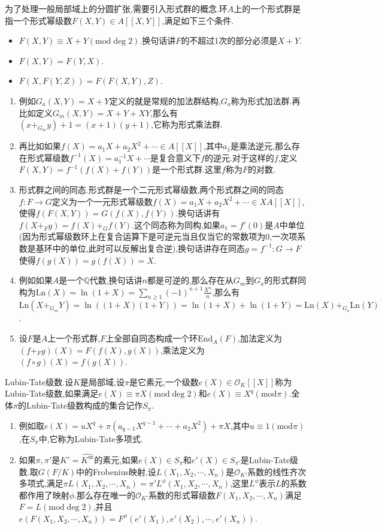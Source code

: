 为了处理一般局部域上的分圆扩张,需要引入形式群的概念.环$A$上的一个形式群是指一个形式幂级数$F(X,Y)\in A[[X,Y]]$,满足如下三个条件.
\begin{itemize}
	\item $F(X,Y)\equiv X+Y(\mathrm{mod}\deg2)$.换句话讲$F$的不超过1次的部分必须是$X+Y$.
	\item $F(X,Y)=F(Y,X)$.
	\item $F(X,F(Y,Z))=F(F(X,Y),Z)$.
\end{itemize}
\begin{enumerate}
	\item 例如$G_a(X,Y)=X+Y$定义的就是常规的加法群结构,$G_a$称为形式加法群.再比如定义$G_m(X,Y)=X+Y+XY$,那么有$(x+_{G_m}y)+1=(x+1)(y+1)$,它称为形式乘法群.
	\item 再比如如果$f(X)=a_1X+a_2X^2+\cdots\in A[[X]]$,其中$a_1$是乘法逆元,那么存在形式幂级数$f^{-1}(X)=a_1^{-1}X+\cdots$是复合意义下$f$的逆元.对于这样的$f$,定义$F(X,Y)=f^{-1}(f(X)+f(Y))$是一个形式群.这里$f$称为$F$的对数.
	\item 形式群之间的同态.形式群是一个二元形式幂级数,两个形式群之间的同态$f:F\to G$定义为一个一元形式幂级数$f(X)=a_1X+a_2X^2+\cdots\in XA[[X]]$,使得$f(F(X,Y))=G(f(X),f(Y))$.换句话讲有$f(X+_Fy)=f(X)+_Gf(Y)$.这个同态称为同构,如果$a_1=f'(0)$是$A$中单位(因为形式幂级数环上在复合运算下是可逆元当且仅当它的常数项为0,一次项系数是基环中的单位,此时可以反解出复合逆),换句话讲存在同态$g=f^{-1}:G\to F$使得$f(g(X))=g(f(X))=X$.
	\item 例如如果$A$是一个$\mathbb{Q}$代数,换句话讲$n$都是可逆的,那么存在从$G_m$到$G_a$的形式群同构为$\mathrm{Ln}(X)=\ln(1+X)=\sum_{n\ge1}(-1)^{n+1}\frac{X^n}{n}$,那么有$\mathrm{Ln}(X+_{G_m}Y)=\ln((1+X)(1+Y))=\ln(1+X)+\ln(1+Y)=\mathrm{Ln}(X)+_{G_a}\mathrm{Ln}(Y)$.
	\item 设$F$是$A$上一个形式群,$F$上全部自同态构成一个环$\mathrm{End}_A(F)$,加法定义为$(f+_Fg)(X)=F(f(X),g(X))$,乘法定义为$(f\circ g)(X)=f(g(X))$.
\end{enumerate}

Lubin-Tate级数.设$K$是局部域,设$\pi$是它素元,一个级数$e(X)\in\mathscr{O}_K[[X]]$称为Lubin-Tate级数,如果满足$e(X)\equiv\pi X(\mathrm{mod}\deg2)$和$e(X)\equiv X^q(\mathrm{mod}\pi)$.全体$\pi$的Lubin-Tate级数构成的集合记作$S_{\pi}$.
\begin{enumerate}
	\item 例如取$e(X)=uX^q+\pi(a_{q-1}X^{q-1}+\cdots+a_2X^2)+\pi X$,其中$u\equiv1(\mathrm{mod}\pi)$,在$S_{\pi}$中,它称为Lubin-Tate多项式.
	\item 如果$\pi,\pi'$是$K'=\widehat{K^{\mathrm{ur}}}$的素元,如果$e(X)\in S_{\pi}$和$e'(X)\in S_{\pi'}$是Lubin-Tate级数.取$G(F/K)$中的Frobenius映射,设$L(X_1,X_2,\cdots,X_n)$是$\mathscr{O}_{K'}$系数的线性齐次多项式,满足$\pi L(X_1,X_2,\cdots,X_n)=\pi'L^{\phi}(X_1,X_2,\cdots,X_n)$,这里$L^{\phi}$表示$L$的系数都作用了映射$\phi$.那么存在唯一的$\mathscr{O}_{K'}$系数的形式幂级数$F(X_1,X_2,\cdots,X_n)$满足$F=L(\mathrm{mod}\deg2)$,并且$e(F(X_1,X_2,\cdots,X_n))=F^{\phi}(e'(X_1),e'(X_2),\cdots,e'(X_n))$.
\end{enumerate}

